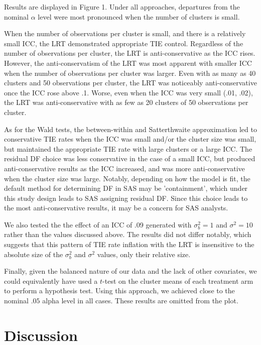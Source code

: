 \documentclass[twocolumn]{bmcart}%
\begin{document}
Results are displayed in Figure 1.  Under all approaches, departures from the nominal $\alpha$ level were most pronounced when the number of clusters is small.

When the number of observations per cluster is small, and there is a relatively small ICC, the LRT demonstrated appropriate TIE control. Regardless of the number of observations per cluster, the LRT is anti-conservative as the ICC rises. However, the anti-conservatism of the LRT was most apparent with smaller ICC when the number of observations per cluster was larger. Even with as many as 40 clusters and 50 observations per cluster, the LRT was noticeably anti-conservative once the ICC rose above .1. Worse, even when the ICC was very small (.01, .02), the LRT was anti-conservative with as few as 20 clusters of 50 observations per cluster.

As for the Wald tests, the between-within and Satterthwaite approximation led to conservative TIE rates when the ICC was small and/or the cluster size was small, but maintained the appropriate TIE rate with large clusters or a large ICC. The residual DF choice was less conservative in the case of a small ICC, but produced anti-conservative results as the ICC increased, and was more anti-conservative when the cluster size was large. Notably, depending on how the model is fit, the default method for determining DF in SAS may be 'containment', which under this study design leads to SAS assigning residual DF. Since this choice leads to the most anti-conservative results, it may be a concern for SAS analysts.

We also tested the the effect of an ICC of .09 generated with $\sigma^2_b = 1$ and $\sigma^2 = 10$ rather than the values discussed above. The results did not differ notably, which suggests that this pattern of TIE rate inflation with the LRT is insensitive to the absolute size of the $\sigma^2_b$ and $\sigma^2$ values, only their relative size.

Finally, given the balanced nature of our data and the lack of other covariates, we could equivalently have used a $t$-test on the cluster means of each treatment arm to perform a hypothesis test. Using this approach, we achieved close to the nominal $.05$ alpha level in all cases. These results are omitted from the plot.

\section*{Discussion}
\end{document}
